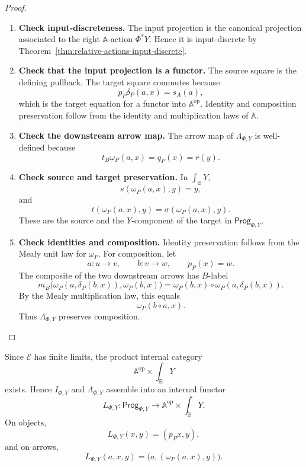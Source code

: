 \begin{proof}
\leavevmode
\begin{enumerate}
\item \textbf{Check input-discreteness.}
The input projection is the canonical projection associated to the right
\(\mathbb A\)-action \(\Phi^\ast Y\). Hence it is input-discrete by
Theorem~\ref{thm:relative-actions-input-discrete}.

\item \textbf{Check that the input projection is a functor.}
The source square is the defining pullback. The target square commutes because
\[
p_P\delta_P(a,x)=s_A(a),
\]
which is the target equation for a functor into \(\mathbb A^{\mathrm{op}}\).
Identity and composition preservation follow from the identity and
multiplication laws of \(\mathbb A\).

\item \textbf{Check the downstream arrow map.}
The arrow map of \(\Lambda_{\Phi,Y}\) is well-defined because
\[
t_B\omega_P(a,x)=q_P(x)=r(y).
\]

\item \textbf{Check source and target preservation.}
In \(\int_{\mathbb B}Y\),
\[
s(\omega_P(a,x),y)=y,
\]
and
\[
t(\omega_P(a,x),y)=\sigma(\omega_P(a,x),y).
\]
These are the source and the \(Y\)-component of the target in
\(\mathsf{Prog}_{\Phi,Y}\).

\item \textbf{Check identities and composition.}
Identity preservation follows from the Mealy unit law for \(\omega_P\). For
composition, let
\[
a:u\to v,
\qquad
b:v\to w,
\qquad
p_P(x)=w.
\]
The composite of the two downstream arrows has \(B\)-label
\[
m_B\bigl(\omega_P(a,\delta_P(b,x)),\omega_P(b,x)\bigr)
=
\omega_P(b,x)\circ \omega_P(a,\delta_P(b,x)).
\]
By the Mealy multiplication law, this equals
\[
\omega_P(b\circ a,x).
\]
Thus \(\Lambda_{\Phi,Y}\) preserves composition.
\end{enumerate}
\end{proof}

\begin{corollary}
\label{cor:relative-combined-labelling}
Since \(\mathcal E\) has finite limits, the product internal category
\[
\mathbb A^{\mathrm{op}}\times\int_{\mathbb B}Y
\]
exists. Hence \(I_{\Phi,Y}\) and \(\Lambda_{\Phi,Y}\) assemble into an internal
functor
\[
L_{\Phi,Y}:
\mathsf{Prog}_{\Phi,Y}
\to
\mathbb A^{\mathrm{op}}\times\int_{\mathbb B}Y.
\]
On objects,
\[
L_{\Phi,Y}(x,y)=(p_Px,y),
\]
and on arrows,
\[
L_{\Phi,Y}(a,x,y)=\bigl(a,(\omega_P(a,x),y)\bigr).
\]
\end{corollary}

